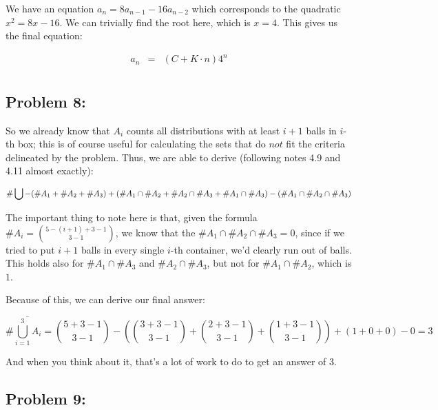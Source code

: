 \documentclass[a4paper]{article}
\begin{document}
We have an equation $a_n = 8a_{n-1} - 16a_{n-2}$ which corresponds to the quadratic $x^2 = 8x-16$. We can trivially find the root here, which is $x=4$. This gives us the final equation:

\begin{equation}
\begin{array}{rcl}
a_n & = & (C + K \cdot n) 4^n \\[.08in]
\end{array}
\end{equation}

\subsection*{Problem 8:}

So we already know that $A_i$ counts all distributions with at least $i+1$ balls in $i$-th box; this is of course useful for calculating the sets that do $\textit{not}$ fit the criteria delineated by the problem. Thus, we are able to derive (following notes 4.9 and 4.11 almost exactly):

\begin{equation}
\# \bigcup - (\#A_1 + \#A_2 + \#A_3) + (\#A_1 \cap \#A_2 + \#A_2 \cap \#A_3 + \#A_1 \cap \#A_3) \\
- (\#A_1 \cap \#A_2 \cap \#A_3)
\end{equation}

The important thing to note here is that, given the formula $\#A_i = \displaystyle \binom{5-(i+1)+3-1}{3-1}$, we know that the $\#A_1 \cap \#A_2 \cap \#A_3 = 0$, since if we tried to put $i+1$ balls in every single $i$-th container, we'd clearly run out of balls. This holds also for $\#A_1 \cap \#A_3$ and $\#A_2 \cap \#A_3$, but not for $\#A_1 \cap \#A_2$, which is $1$.

Because of this, we can derive our final answer:

\begin{equation}
\# \overline{\bigcup_{i=1}^3 A_i}  = \displaystyle \binom{5+3-1}{3-1} - \left( \binom{3+3-1}{3-1} + \binom{2+3-1}{3-1} + \binom{1+3-1}{3-1} \right) + (1+0+0) - 0 = 3
\end{equation}

And when you think about it, that's a lot of work to do to get an answer of $3$.

\subsection*{Problem 9:}
\end{document}
